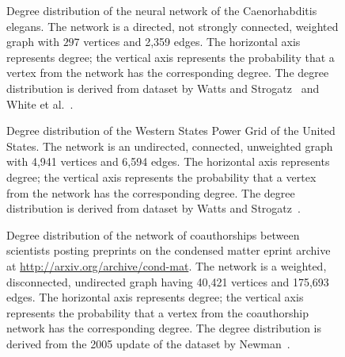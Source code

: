 \begin{figure}[!htbp]
\centering
{}

\caption{Degree distribution of the neural network of the
  Caenorhabditis elegans. The network is a directed, not strongly
  connected, weighted graph with $297$ vertices and 2,359 edges. The
  horizontal axis represents degree; the vertical axis represents the
  probability that a vertex from the network has the corresponding
  degree. The degree distribution is derived from dataset by Watts and
  Strogatz~\cite{WattsStrogatz1998} and White et
  al.~\cite{WhiteEtAl1986}.}
\label{fig:random_graphs:degree_distribution:neural_network_C_elegans}
\end{figure}

\begin{figure}[!htbp]
\centering
{}

\caption{Degree distribution of the Western States Power Grid of the
  United States. The network is an undirected, connected,
  unweighted graph with 4,941 vertices and 6,594 edges. The horizontal
  axis represents degree; the vertical axis represents the probability
  that a vertex from the network has the corresponding degree. The
  degree distribution is derived from dataset by Watts and
  Strogatz~\cite{WattsStrogatz1998}.}
\label{fig:random_graphs:degree_distribution:power_grid}
\end{figure}

\begin{figure}[!htbp]
\centering
{}

\caption{Degree distribution of the network of coauthorships between
  scientists posting preprints on the condensed matter eprint archive
  at \url{http://arxiv.org/archive/cond-mat}. The network is a
  weighted, disconnected, undirected graph having 40,421 vertices and
  175,693 edges. The horizontal axis represents degree; the vertical
  axis represents the probability that a vertex from the coauthorship
  network has the corresponding degree. The degree distribution is
  derived from the 2005 update of the dataset by
  Newman~\cite{Newman2001b}.}
\label{fig:random_graphs:degree_distribution:condensed_matter_collaboration}
\end{figure}


